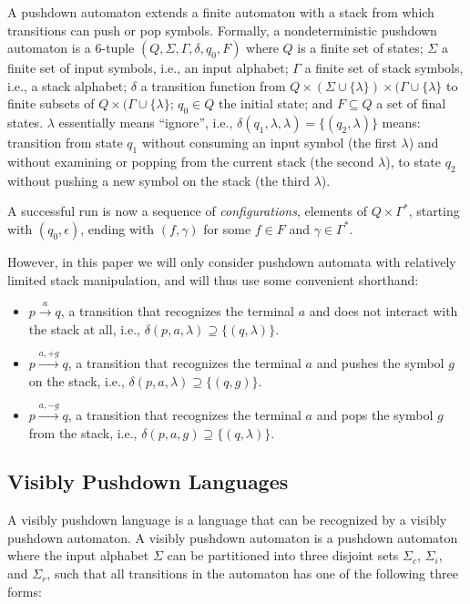 \documentclass[acmsmall,review,anonymous]{acmart}\settopmatter{printfolios=true,printccs=false,printacmref=false}
\newcommand{\T}{\Sigma} %
\begin{document}
A pushdown automaton extends a finite automaton with a stack from which transitions can push or pop symbols. Formally, a nondeterministic pushdown automaton is a 6-tuple $(Q, \T, \Gamma, \delta, q_0, F)$ where $Q$ is a finite set of states; $\T$ a finite set of input symbols, i.e., an input alphabet; $\Gamma$ a finite set of stack symbols, i.e., a stack alphabet; $\delta$ a transition function from $Q \times (\T \cup \{\lambda\}) \times (\Gamma \cup \{\lambda\}$ to finite subsets of $Q \times (\Gamma \cup \{\lambda\}$; $q_0 \in Q$ the initial state; and $F \subseteq Q$ a set of final states. $\lambda$ essentially means ``ignore'', i.e., $\delta(q_1, \lambda, \lambda) = \{(q_2, \lambda)\}$ means: transition from state $q_1$ without consuming an input symbol (the first $\lambda$) and without examining or popping from the current stack (the second $\lambda$), to state $q_2$ without pushing a new symbol on the stack (the third $\lambda$).

A successful run is now a sequence of \emph{configurations}, elements of $Q \times \Gamma^{*}$, starting with $(q_0, \epsilon)$, ending with $(f, \gamma)$ for some $f \in F$ and $\gamma \in \Gamma^{*}$.

However, in this paper we will only consider pushdown automata with relatively limited stack manipulation, and will thus use some convenient shorthand:

\begin{itemize}
\item $p \xrightarrow{a} q$, a transition that recognizes the terminal $a$ and does not interact with the stack at all, i.e., $\delta(p, a, \lambda) \supseteq \{(q, \lambda)\}$.
\item $p \xrightarrow{a, +g} q$, a transition that recognizes the terminal $a$ and pushes the symbol $g$ on the stack, i.e., $\delta(p, a, \lambda) \supseteq \{(q, g)\}$.
\item $p \xrightarrow{a, -g} q$, a transition that recognizes the terminal $a$ and pops the symbol $g$ from the stack, i.e., $\delta(p, a, g) \supseteq \{(q, \lambda)\}$.
\end{itemize}

\subsection{Visibly Pushdown Languages} \label{sec:preliminaries-vpls}

A visibly pushdown language \cite{alurVisiblyPushdownLanguages2004} is a language that can be recognized by a visibly pushdown automaton. A visibly pushdown automaton is a pushdown automaton where the input alphabet $\T$ can be partitioned into three disjoint sets $\T_c$, $\T_i$, and $\T_r$, such that all transitions in the automaton has one of the following three forms:
\end{document}
